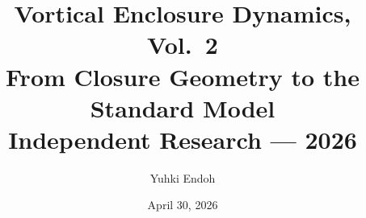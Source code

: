 \documentclass[12pt, a4paper]{article}
\title{
  \large Vortical Enclosure Dynamics, Vol.\ 2\\[0.4em]
  \LARGE \textbf{From Closure Geometry to the Standard Model}\\[0.6em]
  \normalsize Independent Research --- 2026
}
\author{Yuhki Endoh}
\date{April 30, 2026}
\begin{document}
\maketitle
\thispagestyle{empty}

\begin{abstract}

\end{abstract}

\newpage
\tableofcontents
\newpage
















\appendix

\end{document}

